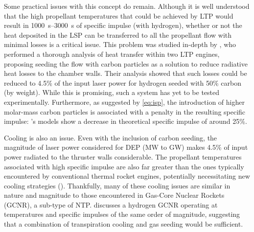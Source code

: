         Some practical issues with this concept do remain. Although it is well understood that the high propellant temperatures that could be achieved by LTP would result in \qtyrange{1000}{3000}{s} of specific impulse (with hydrogen), whether or not the heat deposited in the LSP can be transferred to all the propellant flow with minimal losses is a critical issue. This problem was studied in-depth by \textcite{shojiPerformanceHeatTransfer1976}, who performed a thorough analysis of heat transfer within two LTP engines, proposing seeding the flow with carbon particles as a solution to reduce radiative heat losses to the chamber walls. Their analysis showed that such losses could be reduced to 4.5\% of the input laser power for hydrogen seeded with 50\% carbon (by weight). While this is promising, such a system has yet to be tested experimentally. Furthermore, as suggested by \autoref{eq:isp}, the introduction of higher molar-mass carbon particles is associated with a penalty in the resulting specific impulse: \citeauthor{shojiPerformanceHeatTransfer1976}'s models show a decrease in theoretical specific impulse of around 25\%.

        Cooling is also an issue. Even with the inclusion of carbon seeding, the magnitude of laser power considered for DEP (MW to GW) makes 4.5\% of input power radiated to the thruster walls considerable. The propellant temperatures associated with high specific impulse are also far greater than the ones typically encountered by conventional thermal rocket engines, potentially necessitating new cooling strategies (\textcite{noredApplicationHighPower1976}). Thankfully, many of these cooling issues are similar in nature and magnitude to those encountered in Gas-Core Nuclear Rockets (GCNR), a sub-type of NTP. \textcite{kascakNozzleCavityWall1971} discusses a hydrogen GCNR operating at temperatures and specific impulses of the same order of magnitude, suggesting that a combination of transpiration cooling and gas seeding would be sufficient.

